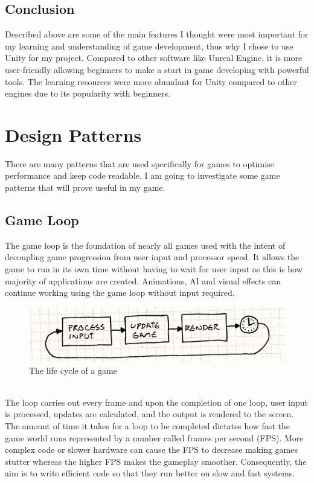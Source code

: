 \documentclass[a4paper]{report}
\begin{document}
\subsection{Conclusion}
Described above are some of the main features I thought were most important for my learning and understanding of game development, thus why I chose to use Unity for my project. Compared to other software like Unreal Engine, it is more user-friendly allowing beginners to make a start in game developing with powerful tools. The learning resources were more abundant for Unity compared to other engines due to its popularity with beginners.

\section{Design Patterns}
There are many patterns that are used specifically for games to optimise performance and keep code readable. I am going to investigate some game patterns that will prove useful in my game. 

\subsection{Game Loop}
The game loop is the foundation of nearly all games used with the intent of decoupling game progression from user input and processor speed. It allows the game to run in its own time without having to wait for user input as this is how majority of applications are created. Animations, AI and visual effects can continue working using the game loop without input required. 
\begin{figure}[h]
	\centering
	\includegraphics[scale=0.55]{game-loop-simple}
	\caption{The life cycle of a game \cite{GPP}}
\end{figure}
\\The loop carries out every frame and upon the completion of one loop, user input is processed, updates are calculated, and the output is rendered to the screen. The amount of time it takes for a loop to be completed dictates how fast the game world runs represented by a number called frames per second (FPS). More complex code or slower hardware can cause the FPS to decrease making games stutter whereas the higher FPS makes the gameplay smoother. Consequently, the aim is to write efficient code so that they run better on slow and fast systems. \cite{GPP}
\end{document}
